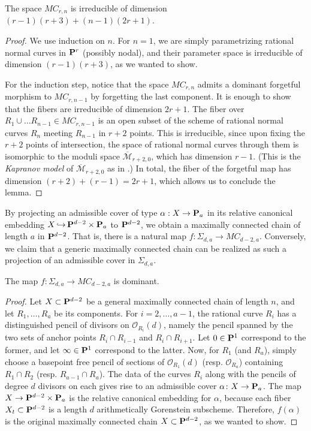 \documentclass[11pt, two side, letterpaper, final]{amsart}
\renewcommand{\P}{{\bf P}}
\newcommand {\from}{\colon}
\newcommand{\into}{{\hookrightarrow}}
\newcommand{\cO}{\mathcal{O}}
\newcommand{\MC}{MC}
\newcommand{\chain}[1]{\P_{#1}}
\begin{document}
\begin{lemma}
The space $\MC_{r,n}$  is irreducible of dimension 
$(r-1)(r+3)+(n-1)(2r+1)$.
\end{lemma}
\begin{proof}
We use induction on $n$. For $n=1$, we are simply parametrizing rational normal curves in $\P^r$ (possibly nodal), and their
parameter space is irreducible of dimension $(r-1)(r+3)$, as we wanted to show. 

For the induction 
step, notice that the space $\MC_{r,n}$ admits a dominant forgetful morphism to $\MC_{r,n-1}$ by forgetting the last 
component. It is enough to show that the fibers are irreducible of dimension $2r+1$. 
The fiber over $R_1 \cup \ldots R_{n-1} \in \MC_{r,n-1}$ is an open subset of the scheme of rational normal curves $R_n$ meeting 
$R_{n-1}$ in $r+2$ points. This is irreducible, since upon fixing the $r+2$ points of intersection, 
the space of rational normal curves through them is isomorphic to the moduli space $\overline{\mathcal{M}}_{r+2,0}$, which has dimension $r-1$. (This is the  \emph{Kapranov model} of $\overline{\mathcal{M}}_{r+2,0}$ as in \cite{kapranov_veronese_1993}.)
In total, the fiber of the forgetful map has dimension $(r+2)+(r-1)=2r+1$, which allows us to conclude the lemma.
\end{proof}

By projecting an admissible cover of type $\alpha:X \to \chain{a}$ in its relative canonical embedding $X \, \into \,\P^{d-2} \times \chain{a}$ to $\P^{d-2}$, we obtain a
maximally connected chain of length $a$ in $\P^{d-2}$. That is, there is a natural map $f :\Sigma_{d,a} \to \MC_{d-2,a}$.
Conversely, we claim that a generic
maximally connected chain can be realized as such a projection of an admissible cover in $\Sigma_{d,a}$.

\begin{lemma} \label{lemma:projection-is-dominant}
The map $f :\Sigma_{d,a} \to \MC_{d-2,a}$ is dominant.
\end{lemma}
\begin{proof}
Let $X \subset \P^{d-2}$ be a general maximally connected chain of length $n$, and let $R_{1}, \ldots , R_{a}$ be its components.  For $i = 2, \ldots ,a-1$, the rational curve $R_{i}$ has a distinguished pencil of divisors on $\cO_{R_{i}}(d)$, namely the pencil spanned by the two sets of anchor points $R_{i} \cap R_{i-1}$ and $R_{i} \cap R_{i+1}$.  Let $0 \in \P^1$ correspond to the former, and let $\infty \in \P^1$ correspond to the latter. Now, for $R_{1}$ (and $R_{a}$), simply choose a basepoint free pencil of sections of $\cO_{R_{1}}(d)$  (resp. $\cO_{R_{a}}$) containing $R_{1} \cap R_{2}$ (resp. $R_{a-1} \cap R_{a}$). The data of the curves $R_{i}$ along with the pencils of degree $d$ divisors on each gives rise to an admissible cover $\alpha \from X \to \chain{a}$. The map $X \to \P^{d-2} \times \chain{a}$ is the relative canonical embedding for $\alpha$, because each fiber $X_t \subset \P^{d-2}$ is a length $d$ arithmetically Gorenstein subscheme. Therefore, $f(\alpha)$ is the
original maximally connected chain $X \subset \P^{d-2}$, as we wanted to show.
\end{proof}
\end{document}
